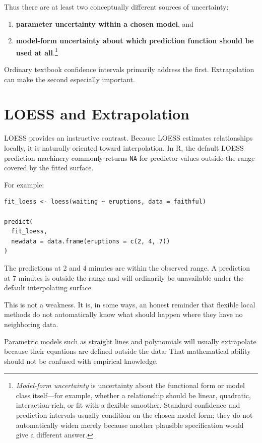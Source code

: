 \documentclass[11pt]{report}
\begin{document}
Thus there are at least two conceptually different sources of uncertainty:

\begin{enumerate}
    \item \textbf{parameter uncertainty within a chosen model}, and
    \item \textbf{model-form uncertainty about which prediction function should be used at all}.\footnote{\emph{Model-form uncertainty} is uncertainty about the functional form or model class itself---for example, whether a relationship should be linear, quadratic, interaction-rich, or fit with a flexible smoother. Standard confidence and prediction intervals usually condition on the chosen model form; they do not automatically widen merely because another plausible specification would give a different answer.}
\end{enumerate}

Ordinary textbook confidence intervals primarily address the first. Extrapolation can make the second especially important.

\section{LOESS and Extrapolation}

LOESS provides an instructive contrast. Because LOESS estimates relationships locally, it is naturally oriented toward interpolation. In R, the default LOESS prediction machinery commonly returns \texttt{NA} for predictor values outside the range covered by the fitted surface.

For example:

\begin{lstlisting}
fit_loess <- loess(waiting ~ eruptions, data = faithful)

predict(
  fit_loess,
  newdata = data.frame(eruptions = c(2, 4, 7))
)
\end{lstlisting}

The predictions at 2 and 4 minutes are within the observed range. A prediction at 7 minutes is outside the range and will ordinarily be unavailable under the default interpolating surface.

This is not a weakness. It is, in some ways, an honest reminder that flexible local methods do not automatically know what should happen where they have no neighboring data.

Parametric models such as straight lines and polynomials will usually extrapolate because their equations are defined outside the data. That mathematical ability should not be confused with empirical knowledge.
\end{document}
